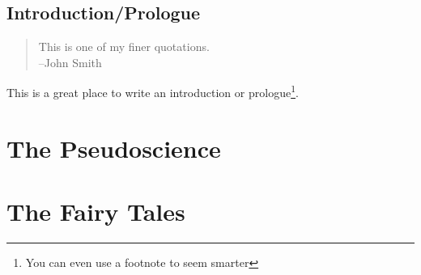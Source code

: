 \documentclass[oneside,11pt]{book} %
\begin{document}
    \chapter*{Introduction/Prologue} %

    \begin{quote}
        This is one of my finer quotations.\\
        --John Smith
    \end{quote}

    This is a great place to write an introduction or prologue\footnote{You can even use a footnote to seem smarter}.

    \part{The Pseudoscience}
    
    
    
    
    
    

    \part{The Fairy Tales}

    
    
    
\end{document}
